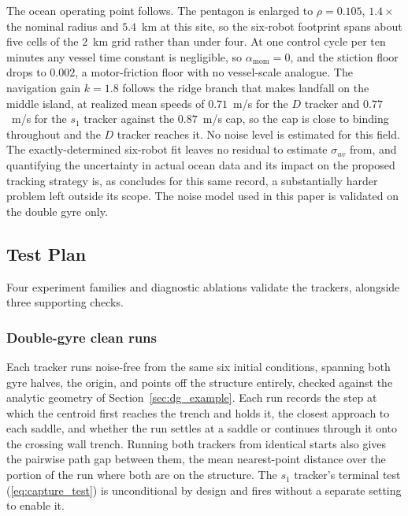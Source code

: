 \documentclass[lettersize,journal]{IEEEtran}
\begin{document}
The ocean operating point follows. The pentagon is enlarged to $\rho = 0.105$,
$1.4\times$ the nominal radius and $5.4$~km at this site, so the
six-robot footprint spans about five cells of the $2$~km grid rather
than under four. At one control cycle per ten minutes any vessel time
constant is negligible, so $\alpha_{\text{mom}} = 0$, and the stiction
floor drops to $0.002$, a motor-friction floor with no vessel-scale
analogue. The navigation gain $k = 1.8$ follows the ridge branch that
makes landfall on the middle island, at realized mean speeds of
$0.71$~m/s for the $D$ tracker and $0.77$~m/s for the $s_1$ tracker
against the $0.87$~m/s cap, so the cap is close to binding throughout
and the $D$ tracker reaches it. No noise level is estimated
for this field. The exactly-determined six-robot fit leaves no residual
to estimate $\sigma_{uv}$ from, and quantifying the uncertainty in
actual ocean data and its impact on the proposed tracking strategy is,
as \cite{17} concludes for this same record, a substantially harder
problem left outside its scope. The noise model used in this paper is
validated on the double gyre only.

\subsection{Test Plan}
\label{sec:test_plan}

Four experiment families and diagnostic ablations validate the trackers, alongside three
supporting checks.

\subsubsection{Double-gyre clean runs}
Each tracker runs noise-free from the same six initial conditions,
spanning both gyre halves, the origin, and points off the structure
entirely, checked against the analytic geometry of Section~\ref{sec:dg_example}. Each
run records the step at which the
centroid first reaches the trench and holds it, the closest approach to
each saddle, and whether the run settles at a saddle or continues
through it onto the crossing wall trench. Running both trackers from
identical starts also gives the pairwise path gap between them, the mean
nearest-point distance over the portion of the run where both are on the
structure. The $s_1$ tracker's terminal test (\ref{eq:capture_test}) is
unconditional by design and fires without a separate setting to enable it.
\end{document}
